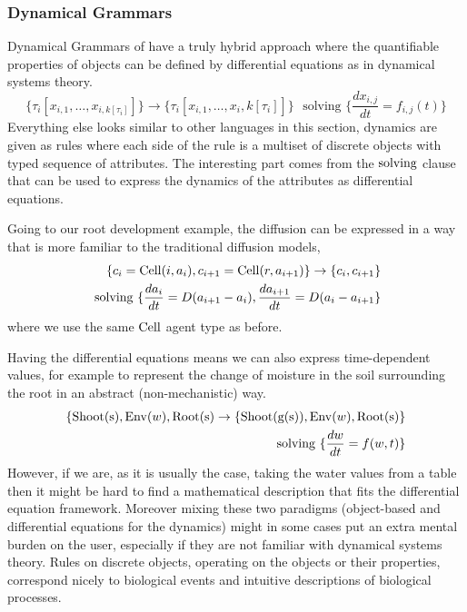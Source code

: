 \subsubsection*{Dynamical Grammars}
Dynamical Grammars of \citet{mjolsness2006stochastic} have a truly hybrid
approach where the quantifiable properties of objects can be defined by
differential equations as in dynamical systems theory.
$$
\{\tau_i[x_{i, 1}, \dots, x_{i, k[\tau_i]}] \} \rightarrow \{\tau_i[x_{i, 1}, \dots, x_i, k[\tau_i]]\} \, \,
\text{ solving } \{\frac{dx_{i,j}}{dt}=f_{i, j}(t)\}
$$
Everything else looks similar to other languages in this section, dynamics are
given as rules where each side of the rule is a multiset of discrete objects
with typed sequence of attributes. The interesting part comes from the
$\mathrm{solving}$ clause that can be used to express the dynamics of the attributes
as differential equations.

Going to our root development example, the diffusion can be expressed in a way
that is more familiar to the traditional diffusion models,
\begin{align*}
\{c_i=\mathrm{Cell}(i, a_i), c_{i+1}=\mathrm{Cell}(r, a_{i+1})\} \rightarrow \{c_i,
  c_{i+1}\} \\
  \text{ solving }\{\frac{da_i}{dt}=D(a_{i+1}-a_i),
  \frac{da_{i+1}}{dt}=D(a_i - a_{i+1} \}
\end{align*}
where we use the same $\mathrm{Cell}$ agent type as before.

Having the differential equations means we can also express time-dependent
values, for example to represent the change of moisture in the soil surrounding
the root in an abstract (non-mechanistic) way.
\begin{align*}
\{\mathrm{Shoot(s)}, \mathrm{Env}(w), \mathrm{Root(s)} \rightarrow \{\mathrm{Shoot(g(s))}, \mathrm{Env}(w),
  \mathrm{Root(s)} \} \\
  \text{ solving }\{\frac{dw}{dt}=f(w, t) \}
\end{align*}
However, if we are, as it is usually the case, taking the water values from a
table then it might be hard to find a mathematical description that fits the
differential equation framework. Moreover mixing these two paradigms
(object-based and differential equations for the dynamics) might in some cases
put an extra mental burden on the user, especially if they are not familiar with
dynamical systems theory. Rules on discrete objects, operating on the objects or
their properties, correspond nicely to biological events and intuitive
descriptions of biological processes.

